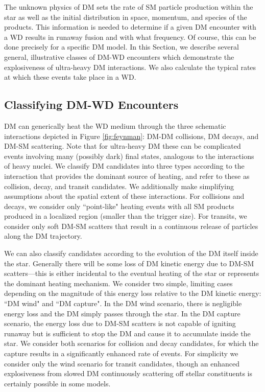 \documentclass[twocolumn, preprintnumbers,amsmath,amssymb,prd, superscriptaddress]{revtex4}
\begin{document}
The unknown physics of DM sets the rate of SM particle production within the star as well as the initial distribution in space, momentum, and species of the products.
This information is needed to determine if a given DM encounter with a WD results in runaway fusion and with what frequency.
Of course, this can be done precisely for a specific DM model.
In this Section, we describe several general, illustrative classes of DM-WD encounters which demonstrate the explosiveness of ultra-heavy DM interactions.
We also calculate the typical rates at which these events take place in a WD.

\subsection{Classifying DM-WD Encounters}

DM can generically heat the WD medium through the three schematic interactions depicted in Figure \ref{fig:feynman}: DM-DM collisions, DM decays, and DM-SM scattering.
Note that for ultra-heavy DM these can be complicated events involving many (possibly dark) final states, analogous to the interactions of heavy nuclei.
We classify DM candidates into three types according to the interaction that provides the dominant source of heating, and refer to these as collision, decay, and transit candidates.
We additionally make simplifying assumptions about the spatial extent of these interactions.
For collisions and decays, we consider only ``point-like" heating events with all SM products produced in a localized region (smaller than the trigger size).
For transits, we consider only soft DM-SM scatters that result in a continuous release of particles along the DM trajectory.

We can also classify candidates according to the evolution of the DM itself inside the star.
Generally there will be some loss of DM kinetic energy due to DM-SM scatters---this is either incidental to the eventual heating of the star or represents the dominant heating mechanism.
We consider two simple, limiting cases depending on the magnitude of this energy loss relative to the DM kinetic energy: ``DM wind" and ``DM capture".
In the DM wind scenario, there is negligible energy loss and the DM simply passes through the star.
In the DM capture scenario, the energy loss due to DM-SM scatters is not capable of igniting runaway but is sufficient to stop the DM and cause it to accumulate inside the star.
We consider both scenarios for collision and decay candidates, for which the capture results in a significantly enhanced rate of events.
For simplicity we consider only the wind scenario for transit candidates, though an enhanced explosiveness from slowed DM continuously scattering off stellar constituents is certainly possible in some models.
\end{document}
